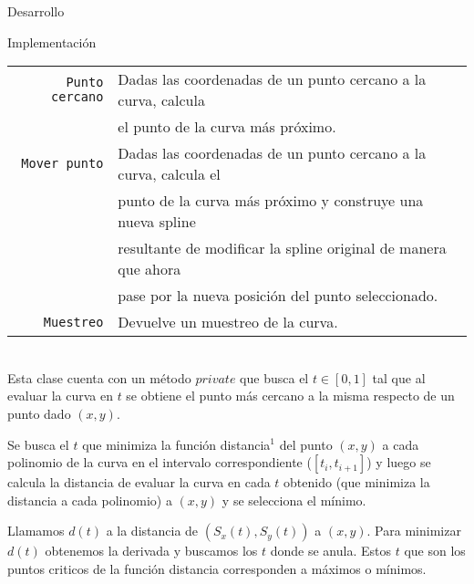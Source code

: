 \begin{section}{Desarrollo}
\begin{subsection}{Implementación}
\begin{itemize}
				\begin{tabular}{rl}
					\texttt{Punto cercano} & Dadas las coordenadas de un punto cercano a la curva, calcula\\
										   & el punto de la curva más próximo.\\
					\texttt{Mover punto} & Dadas las coordenadas de un punto cercano a la curva, calcula el\\
										 & punto de la curva más próximo y construye una nueva spline\\
										 & resultante de modificar la spline original de manera que ahora\\
										 & pase por la nueva posición del punto seleccionado.\\
					\texttt{Muestreo} & Devuelve un muestreo de la curva.\\
				\end{tabular}\\
				
				Esta clase cuenta con un método $private$ que busca el $t \in [0,1]$ tal que al evaluar la curva en $t$ se obtiene el punto más cercano a la 
				misma respecto de un punto dado $(x,y)$.
				
				Se busca el $t$ que minimiza la función distancia$^1$
				del punto $(x,y)$ a cada polinomio de la curva en el intervalo correspondiente ($[t_i,t_{i+1}]$) y luego se calcula la distancia de evaluar
				la curva en cada $t$ obtenido (que minimiza la distancia a cada polinomio) a $(x,y)$ y se selecciona el mínimo.
				
				Llamamos $d(t)$ a la distancia de $(S_x(t),S_y(t))$ a $(x,y)$. Para minimizar $d(t)$ obtenemos la derivada y buscamos los $t$ donde se anula. 
				Estos $t$ que son los puntos criticos de la función distancia corresponden a máximos o mínimos. 
				
				
		\end{itemize}
	\end{subsection}
\end{section}

